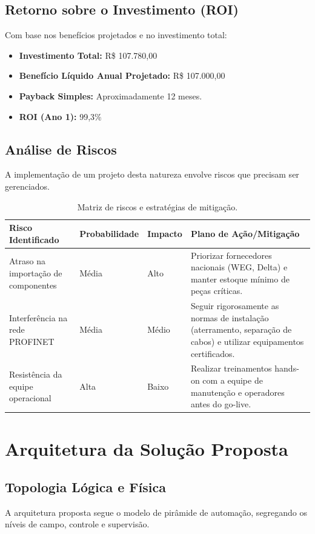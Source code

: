 \documentclass[12pt,a4paper]{article}
\begin{document}
\subsection{Retorno sobre o Investimento (ROI)}
Com base nos benefícios projetados e no investimento total:
\begin{itemize}
    \item \textbf{Investimento Total:} R\$ 107.780,00
    \item \textbf{Benefício Líquido Anual Projetado:} R\$ 107.000,00
    \item \textbf{Payback Simples:} Aproximadamente 12 meses.
    \item \textbf{ROI (Ano 1):} 99,3\%
\end{itemize}

\subsection{Análise de Riscos}
A implementação de um projeto desta natureza envolve riscos que precisam ser gerenciados.

\begin{table}[h]
\centering
\begin{tabular}{@{}p{3.5cm}p{2.5cm}p{2.5cm}p{4.5cm}@{}}
\toprule
\textbf{Risco Identificado} & \textbf{Probabilidade} & \textbf{Impacto} & \textbf{Plano de Ação/Mitigação} \\
\midrule
Atraso na importação de componentes & Média & Alto & Priorizar fornecedores nacionais (WEG, Delta) e manter estoque mínimo de peças críticas. \\
\midrule
Interferência na rede PROFINET & Média & Médio & Seguir rigorosamente as normas de instalação (aterramento, separação de cabos) e utilizar equipamentos certificados. \\
\midrule
Resistência da equipe operacional & Alta & Baixo & Realizar treinamentos hands-on com a equipe de manutenção e operadores antes do go-live. \\
\bottomrule
\end{tabular}
\caption{Matriz de riscos e estratégias de mitigação.}
\end{table}

\section{Arquitetura da Solução Proposta}

\subsection{Topologia Lógica e Física}
A arquitetura proposta segue o modelo de pirâmide de automação, segregando os níveis de campo, controle e supervisão.
\end{document}

